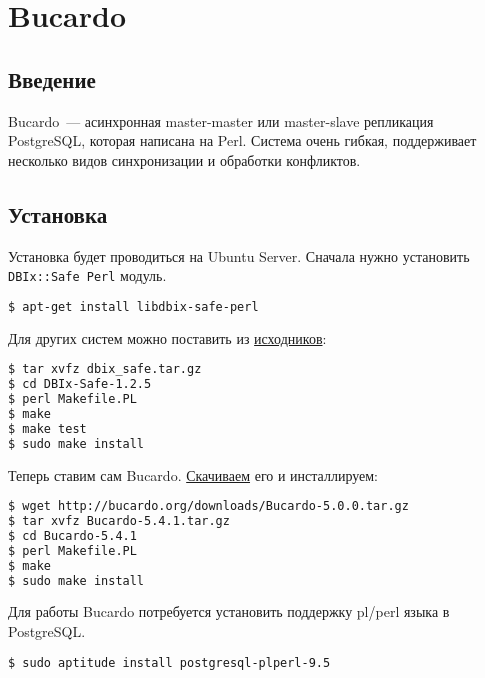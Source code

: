\section{Bucardo}

\subsection{Введение}

Bucardo~--- асинхронная master-master или master-slave репликация PostgreSQL, которая написана на Perl. Система очень гибкая, поддерживает несколько видов синхронизации и обработки конфликтов.

\subsection{Установка}

Установка будет проводиться на Ubuntu Server. Сначала нужно установить \lstinline!DBIx::Safe Perl! модуль.

\begin{lstlisting}[language=Bash,label=lst:bucardo1,caption=Установка]
$ apt-get install libdbix-safe-perl
\end{lstlisting}

Для других систем можно поставить из \href{http://search.cpan.org/CPAN/authors/id/T/TU/TURNSTEP/}{исходников}:

\begin{lstlisting}[language=Bash,label=lst:bucardo2,caption=Установка]
$ tar xvfz dbix_safe.tar.gz
$ cd DBIx-Safe-1.2.5
$ perl Makefile.PL
$ make
$ make test
$ sudo make install
\end{lstlisting}

Теперь ставим сам Bucardo. \href{http://bucardo.org/wiki/Bucardo#Obtaining_Bucardo}{Скачиваем} его и инсталлируем:

\begin{lstlisting}[language=Bash,label=lst:bucardo3,caption=Установка]
$ wget http://bucardo.org/downloads/Bucardo-5.0.0.tar.gz
$ tar xvfz Bucardo-5.4.1.tar.gz
$ cd Bucardo-5.4.1
$ perl Makefile.PL
$ make
$ sudo make install
\end{lstlisting}

Для работы Bucardo потребуется установить поддержку pl/perl языка в PostgreSQL.

\begin{lstlisting}[language=Bash,label=lst:bucardo4,caption=Установка]
$ sudo aptitude install postgresql-plperl-9.5
\end{lstlisting}

